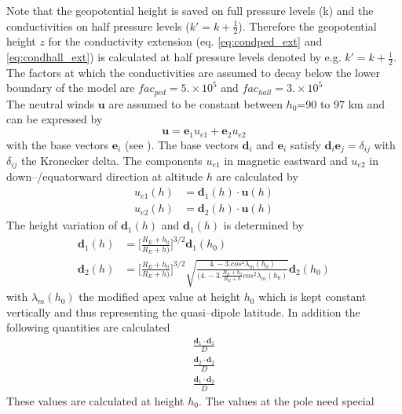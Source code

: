 % 
Note that the geopotential height is saved on full pressure levels (k) and 
the conductivities on half pressure levels ($k'=k+\frac{1}{2}$). 
Therefore the geopotential height $z$ for
the conductivity extension (eq. \ref{eq:condped_ext} and 
\ref{eq:condhall_ext}) is calculated at half pressure levels denoted by e.g.
$k'=k+\frac{1}{2}$. The factors at which the conductivities are assumed to decay
below the lower boundary of the model are $fac_{ped}= 5. \times 10^5$ and 
$fac_{hall}= 3. \times 10^5$ \\

The neutral winds $\mathbf{u}$ are assumed to be constant between $h_0$=90 
to 97 km and
can be expressed by
%
\begin{equation}
   \mathbf{u} = \mathbf{e}_1 u_{e1} + \mathbf{e}_2 u_{e2}
\end{equation}
%
with the base vectors $\mathbf{e}_i$  (see \cite{rich95}).
The base vectors $\mathbf{d}_i$ and $\mathbf{e}_i$ satisfy
$\mathbf{d}_i \mathbf{e}_j = \delta_{ij}$ with $\delta_{ij}$ the Kronecker
delta. The components $u_{e1}$
in magnetic eastward and  $u_{e2}$ in down--/equatorward direction at altitude
$h$  are  calculated by 
%
\begin{align}
  u_{e1}(h) &= \mathbf{d}_1(h) \cdot \mathbf{u}(h) \\
  u_{e2}(h) &= \mathbf{d}_2(h) \cdot \mathbf{u}(h)
\end{align}
% 
The height variation of $\mathbf{d}_1(h)$ and $\mathbf{d}_1(h)$ is determined by 
%
\begin{align}
  \mathbf{d}_1(h) &= \bigl[\frac{R_E+h_0}{R_E+h)} \bigr]^{3/2} \mathbf{d}_1(h_0)\label{eq:vary_h_d1} \\
  \mathbf{d}_2(h) &= \bigl[\frac{R_E+h_0}{R_E+h)}\bigr]^{3/2}
      \sqrt{\frac{4.-3. cos^2\lambda_m(h_0)}{(4.-3. \frac{R_E+h_0}{R_E+h} 
      cos^2\lambda_m(h_0)}} \mathbf{d}_2(h_0) \label{eq:vary_h_d2}	    
\end{align}
%
with $\lambda_m(h_0)$ the modified apex value at height $h_0$ which is kept 
constant vertically and thus representing the quasi--dipole latitude.
%
In addition the following quantities are calculated
%
\begin{align}
  \frac{\mathbf{d}_1 \cdot \mathbf{d}_1}{D} \\
  \frac{\mathbf{d}_2 \cdot \mathbf{d}_2}{D} \\
  \frac{\mathbf{d}_1 \cdot \mathbf{d}_2}{D}
\end{align}
% 
These values are calculated at height $h_0$. The values at the pole need special

